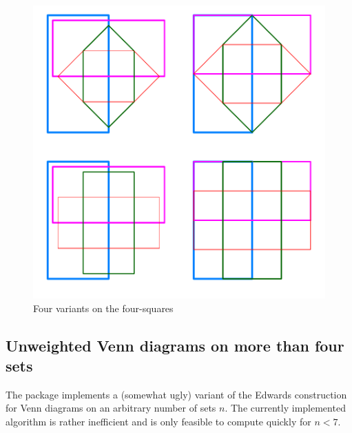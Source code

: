 \documentclass[a4paper]{article}
\begin{document}
\begin{figure}[H]\begin{center}
\includegraphics{Vennfig-S4fig}
\caption{Four variants on the four-squares}
\end{center}\end{figure}


\clearpage
\subsection{Unweighted Venn diagrams on more than four sets}

The package implements a (somewhat ugly) variant of the Edwards construction
for Venn diagrams on an arbitrary number of sets $n$. The currently implemented algorithm is rather 
inefficient and is only feasible to compute quickly for $n<7$. 
\end{document}
